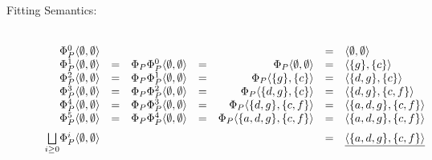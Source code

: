 \begin{Loesung}
\begin{UList}
\begin{description}
%
\end{description}\newpage
%
\item
\begin{description}

 \item[Fitting Semantics:] ~\\
   \(
   \begin{array}{rcrcrcl}
     \Phi^0_P\langle \emptyset,\emptyset\rangle & & & & & = &
     \langle\emptyset,\emptyset\rangle \\
     \Phi^1_P\langle \emptyset,\emptyset\rangle & = & 
     \Phi_P\Phi^0_P\langle \emptyset,\emptyset\rangle & = &
     \Phi_P\langle \emptyset,\emptyset\rangle & = & 
     \langle\{g\},\{c\}\rangle \\
     \Phi^2_P\langle \emptyset,\emptyset\rangle & = & 
     \Phi_P\Phi^1_P\langle \emptyset,\emptyset\rangle & = &
     \Phi_P\langle \{g\},\{c\}\rangle & = & 
     \langle\{d,g\},\{c\}\rangle \\
     \Phi^3_P\langle \emptyset,\emptyset\rangle & = & 
     \Phi_P\Phi^2_P\langle \emptyset,\emptyset\rangle & = &
     \Phi_P\langle \{d,g\},\{c\}\rangle & = & 
     \langle\{d,g\},\{c,f\}\rangle \\
     \Phi^4_P\langle \emptyset,\emptyset\rangle & = & 
     \Phi_P\Phi^3_P\langle \emptyset,\emptyset\rangle & = &
     \Phi_P\langle \{d,g\},\{c,f\}\rangle & = & 
     \langle\{a,d,g\},\{c,f\}\rangle \\
     \Phi^5_P\langle \emptyset,\emptyset\rangle & = & 
     \Phi_P\Phi^4_P\langle \emptyset,\emptyset\rangle & = &
     \Phi_P\langle \{a,d,g\},\{c,f\}\rangle & = & 
     \langle\{a,d,g\},\{c,f\}\rangle \\[2mm]
     \underset{i\geq 0}{\bigsqcup}\Phi^i_P\langle \emptyset,\emptyset\rangle 
     & & & & & = & \underline{\langle\{a,d,g\},\{c,f\}\rangle}
   \end{array}
   \)


\end{description}
\end{UList}
\end{Loesung}
